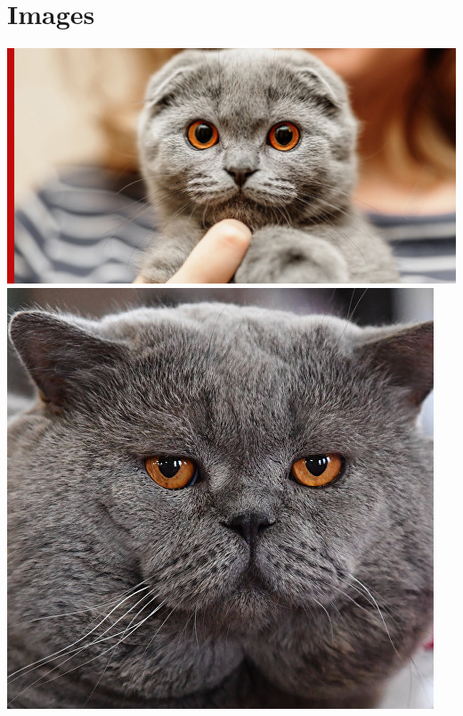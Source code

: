 \documentclass[10pt,a4paper]{report}
\begin{document}
\section{Images}
\begin{center}
\end{center}
\includegraphics[width=0.7\linewidth, right]{photos/906045-fb.jpeg}
\includegraphics[width=0.7\linewidth, right]{photos/834107650.jpg}
\end{document}
